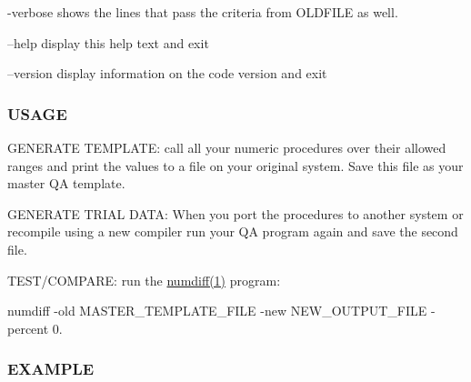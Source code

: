 -\/verbose shows the lines that pass the criteria from O\+L\+D\+F\+I\+LE as well.

--help display this help text and exit

--version display information on the code version and exit

\subsubsection*{U\+S\+A\+GE}


\begin{DoxyEnumerate}
\item G\+E\+N\+E\+R\+A\+TE T\+E\+M\+P\+L\+A\+TE\+: call all your numeric procedures over their allowed ranges and print the values to a file on your original system. Save this file as your master QA template.
\item G\+E\+N\+E\+R\+A\+TE T\+R\+I\+AL D\+A\+TA\+: When you port the procedures to another system or recompile using a new compiler run your QA program again and save the second file.
\item T\+E\+S\+T/\+C\+O\+M\+P\+A\+RE\+: run the \hyperlink{what__overview_81_8txt_a7d9f0f7f68d767709cf298ae59490237}{numdiff(1)} program\+:

numdiff -\/old M\+A\+S\+T\+E\+R\+\_\+\+T\+E\+M\+P\+L\+A\+T\+E\+\_\+\+F\+I\+LE -\/new N\+E\+W\+\_\+\+O\+U\+T\+P\+U\+T\+\_\+\+F\+I\+LE -\/percent 0.
\end{DoxyEnumerate}

\subsubsection*{E\+X\+A\+M\+P\+LE}

